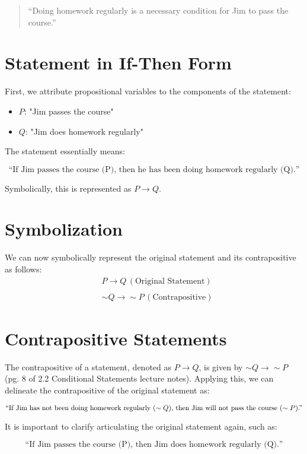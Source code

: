 \documentclass[12pt]{article}
\begin{document}
\begin{quote}
“Doing homework regularly is a necessary condition for Jim to pass the course.”
\end{quote}

\section*{Statement in If-Then Form}
First, we attribute propositional variables to the components of the statement:
\begin{itemize}
    \item \( P \): "Jim passes the course"
    \item \( Q \): "Jim does homework regularly"
\end{itemize}

The statement essentially means:

\[
\text{“If Jim passes the course (P), then he has been doing homework regularly (Q).”}
\]

Symbolically, this is represented as \( P \rightarrow Q \).

\section*{Symbolization}
We can now symbolically represent the original statement and its contrapositive as follows:
\begin{align*}
& P \rightarrow Q \, (\text{Original Statement}) \\ \\
& \sim Q \rightarrow \sim P \, (\text{Contrapositive}) 
\end{align*}

\section*{Contrapositive Statements}
The contrapositive of a statement, denoted as \( P \rightarrow Q \), is given by \( \sim Q \rightarrow \sim P \) (pg. 8 of 2.2 Conditional Statements lecture notes). Applying this, we can delineate the contrapositive of the original statement as:

\[
\text{“If Jim has not been doing homework regularly (\( \sim Q \)), then Jim will not pass the course (\( \sim P \)).”}
\]

It is important to clarify articulating the original statement again, such as:

\[
\text{“If Jim passes the course (P), then Jim does homework regularly (Q).”}
\]
\end{document}
